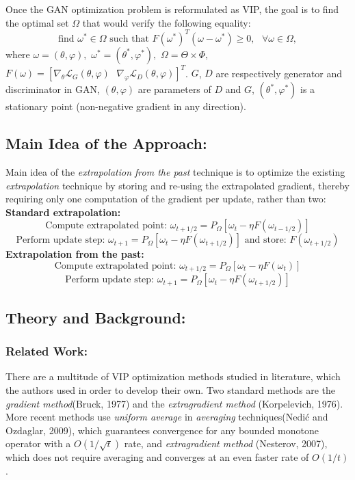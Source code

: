 \documentclass[11pt]{article}
\begin{document}
	Once the GAN optimization problem is reformulated as VIP, the goal is to find the optimal set $\Omega$ that would verify the following equality: 
	$$
	\textrm{find } \omega^*\in\Omega \textrm{ such that } F(\omega^*)^T(\omega-\omega^*)\geq0,\textrm{ } \forall\omega\in\Omega,
	$$
	where $\omega=(\theta,\varphi),$  $\omega^*=(\theta^*,\varphi^*),$ $\Omega=\Theta\times\Phi,$ $F(\omega)=[\nabla_{\theta}\mathcal{L}_G(\theta,\varphi)\textrm{ }\nabla_{\varphi}\mathcal{L}_D(\theta,\varphi)]^T$. $G$, $D$ are respectively generator and discriminator in GAN, $(\theta,\varphi)$ are parameters of $D$ and $G$, $(\theta^*,\varphi^*)$ is a stationary point (non-negative gradient in any direction).
	
	\subsection{Main Idea of the Approach:}
	
	Main idea of the \textit{extrapolation from the past} technique is to optimize the existing \textit{extrapolation} technique by storing and re-using the extrapolated gradient, thereby requiring only one computation of the gradient per update, rather than two: \\
	\textbf{Standard extrapolation:}
	$$
	\textrm{Compute extrapolated point: }\omega_{t+1/2}=P_{\Omega}[\omega_t-\eta F(\omega_{t-1/2})] $$
	$$
	\textrm{Perform update step: }\omega_{t+1}=P_{\Omega}[\omega_t-\eta F(\omega_{t+1/2})]\textrm{ and store: }F(\omega_{t+1/2})
	$$
	\textbf{Extrapolation from the past:}
	$$
	\textrm{Compute extrapolated point: }\omega_{t+1/2}=P_{\Omega}[\omega_t-\eta F(\omega_t)]
	$$
	$$
	\textrm{Perform update step: }\omega_{t+1}=P_{\Omega}[\omega_t-\eta F(\omega_{t+1/2})]
	$$
	
	\subsection{Theory and Background:}
		
		\subsubsection{Related Work:}
		There are a multitude of VIP optimization methods studied in literature, which the authors used in order to develop their own. Two standard methods are the \textit{gradient method}(Bruck, 1977) and the \textit{extragradient method} (Korpelevich, 1976). More recent methods use \textit{uniform average} in \textit{averaging} techniques(Nedi\'c and Ozdaglar, 2009), which guarantees convergence for any bounded monotone operator with a $O(1/\sqrt{t})$ rate, and \textit{extragradient method} (Nesterov, 2007), which does not require averaging and converges at an even faster rate of $O(1/t)$. \\
		
\end{document}
